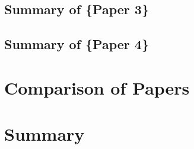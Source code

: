 \subsection{Summary of \{Paper 3\}}


\subsection{Summary of \{Paper 4\}}

\section{\label{sec:level5} Comparison of Papers}

\section{\label{sec:level6} Summary}
